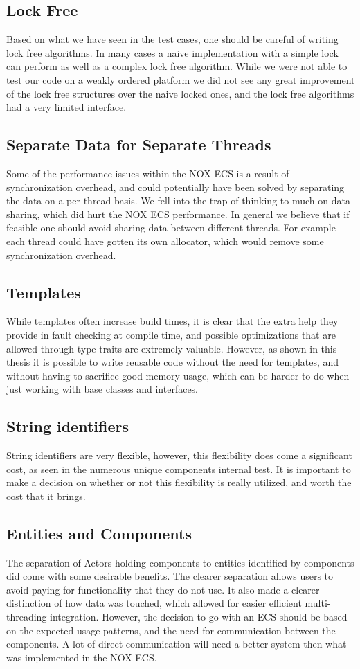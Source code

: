 \subsection{Lock Free}
Based on what we have seen in the test cases, one should be careful of writing lock free algorithms.
In many cases a naive implementation with a simple lock can perform as well as a complex lock free algorithm.
While we were not able to test our code on a weakly ordered platform we did not see any great improvement
of the lock free structures over the naive locked ones, and the lock free algorithms had a very limited interface.

\subsection{Separate Data for Separate Threads}
Some of the performance issues within the NOX ECS is a result of synchronization overhead,
and could potentially have been solved by separating the data on a per thread basis.
We fell into the trap of thinking to much on data sharing, which did hurt the NOX ECS performance.
In general we believe that if feasible one should avoid sharing data between different threads.
For example each thread could have gotten its own allocator, which would remove some synchronization overhead.

\subsection{Templates}
While templates often increase build times, it is clear that the extra help they provide in
fault checking at compile time, and possible optimizations that are allowed through type traits
are extremely valuable.
However, as shown in this thesis it is possible to write reusable code without the need for templates,
and without having to sacrifice good memory usage, which can be harder to do when just working with
base classes and interfaces.

\subsection{String identifiers}
String identifiers are very flexible, however, this flexibility does come a significant cost, as seen
in the numerous unique components internal test.
It is important to make a decision on whether or not this flexibility is really utilized, and worth
the cost that it brings.

\subsection{Entities and Components}
The separation of Actors holding components to entities identified by components did come with some
desirable benefits. The clearer separation allows users to avoid paying for functionality that they
do not use. It also made a clearer distinction of how data was touched, which allowed for easier efficient
multi-threading integration.
However, the decision to go with an ECS should be based on the expected usage patterns, and the
need for communication between the components.
A lot of direct communication will need a better system then what was implemented in the NOX ECS.

